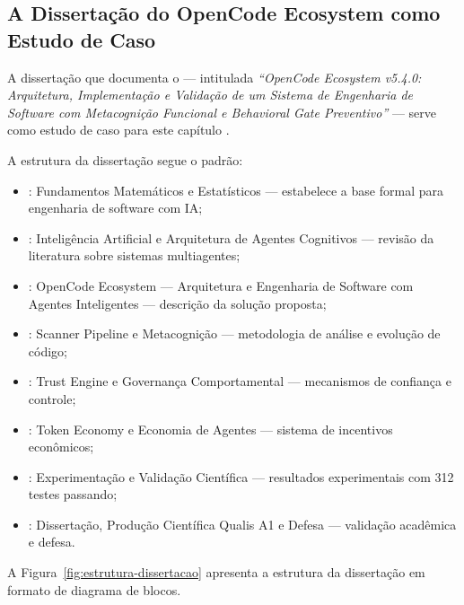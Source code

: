 \subsection{A Dissertação do OpenCode Ecosystem como Estudo de Caso}

A dissertação que documenta o \opencodeeco{} --- intitulada \textit{``OpenCode
Ecosystem v5.4.0: Arquitetura, Implementação e Validação de um Sistema de
Engenharia de Software com Metacognição Funcional e Behavioral Gate
Preventivo''} --- serve como estudo de caso para este capítulo
\cite{opencode2026ecosystem}.

A estrutura da dissertação segue o padrão:

\begin{itemize}
\item {}: Fundamentos Matemáticos e Estatísticos ---
      estabelece a base formal para engenharia de software com IA;
\item {}: Inteligência Artificial e Arquitetura de Agentes
      Cognitivos --- revisão da literatura sobre sistemas multiagentes;
\item {}: OpenCode Ecosystem --- Arquitetura e Engenharia
      de Software com Agentes Inteligentes --- descrição da solução proposta;
\item {}: Scanner Pipeline e Metacognição --- metodologia
      de análise e evolução de código;
\item {}: Trust Engine e Governança Comportamental ---
      mecanismos de confiança e controle;
\item {}: Token Economy e Economia de Agentes --- sistema
      de incentivos econômicos;
\item {}: Experimentação e Validação Científica ---
      resultados experimentais com 312 testes passando;
\item {}: Dissertação, Produção Científica Qualis A1 e
      Defesa --- validação acadêmica e defesa.
\end{itemize}

A Figura~\ref{fig:estrutura-dissertacao} apresenta a estrutura da dissertação
em formato de diagrama de blocos.

